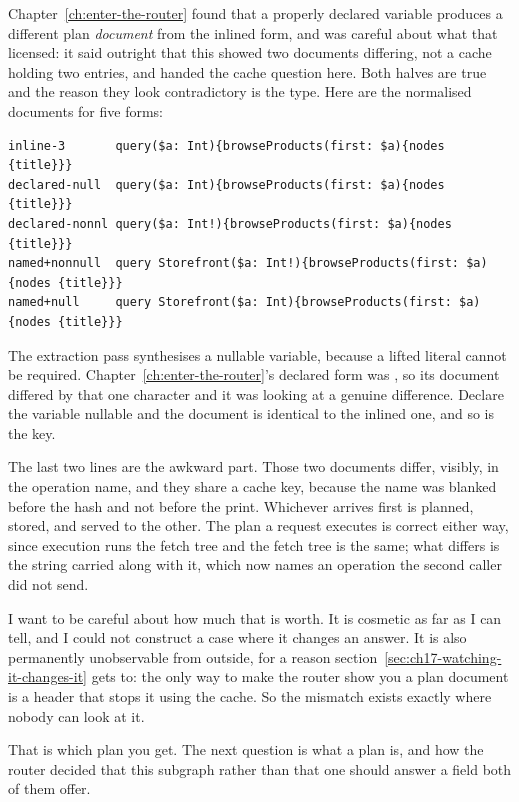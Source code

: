 %
Chapter~\ref{ch:enter-the-router} found that a properly declared variable
produces a different plan \emph{document} from the inlined form, and was careful
about what that licensed: it said outright that this showed two documents
differing, not a cache holding two entries, and handed the cache question here.
Both halves are true and the reason they look contradictory is the type. Here
are the normalised documents for five forms:

\begin{verbatim}
inline-3       query($a: Int){browseProducts(first: $a){nodes {title}}}
declared-null  query($a: Int){browseProducts(first: $a){nodes {title}}}
declared-nonnl query($a: Int!){browseProducts(first: $a){nodes {title}}}
named+nonnull  query Storefront($a: Int!){browseProducts(first: $a){nodes {title}}}
named+null     query Storefront($a: Int){browseProducts(first: $a){nodes {title}}}
\end{verbatim}

The extraction pass synthesises a nullable variable, because a lifted literal
cannot be required. Chapter~\ref{ch:enter-the-router}'s declared form was
, so its document differed by that one character and it was
looking at a genuine difference. Declare the variable nullable and the document
is identical to the inlined one, and so is the key.

%
The last two lines are the awkward part. Those two documents differ, visibly, in
the operation name, and they share a cache key, because the name was blanked
before the hash and not before the print. Whichever arrives first is planned,
stored, and served to the other. The plan a request executes is correct either
way, since execution runs the fetch tree and the fetch tree is the same; what
differs is the  string carried along with it, which now
names an operation the second caller did not send.

I want to be careful about how much that is worth. It is cosmetic as far as I
can tell, and I could not construct a case where it changes an answer. It is
also permanently unobservable from outside, for a reason
section~\ref{sec:ch17-watching-it-changes-it} gets to: the only way to make the
router show you a plan document is a header that stops it using the cache. So
the mismatch exists exactly where nobody can look at it.

\medskip
That is which plan you get. The next question is what a plan is, and how the
router decided that this subgraph rather than that one should answer a field
both of them offer.

%
